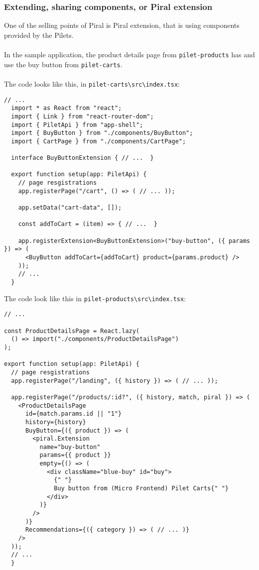 \documentclass[a4paper]{book}
\begin{document}
\subsubsection{Extending, sharing components, or Piral extension}
One of the selling points of Piral is Piral extension, that is using components provided by the Pilets. 
\\ \\
In the sample application, the product details page from \verb|pilet-products| has and use the buy button from \verb|pilet-carts|. 
\\ \\The code looks like this, in \verb|pilet-carts\src\index.tsx|:

\begin{lstlisting}[caption={pilet-carts extension}]
  // ...
  import * as React from "react";
  import { Link } from "react-router-dom";
  import { PiletApi } from "app-shell";
  import { BuyButton } from "./components/BuyButton";
  import { CartPage } from "./components/CartPage";
  
  interface BuyButtonExtension { // ...  }
  
  export function setup(app: PiletApi) {
    // page resgistrations
    app.registerPage("/cart", () => ( // ... ));
    
    app.setData("cart-data", []);
  
    const addToCart = (item) => { // ...  }
  
    app.registerExtension<BuyButtonExtension>("buy-button", ({ params }) => (
      <BuyButton addToCart={addToCart} product={params.product} />
    ));
    // ...
  }
\end{lstlisting}

The code look like this in \verb|pilet-products\src\index.tsx|:

\begin{lstlisting}[caption={pilet-products uses pilet-carts extension}]
  // ...

const ProductDetailsPage = React.lazy(
  () => import("./components/ProductDetailsPage")
);

export function setup(app: PiletApi) {
  // page resgistrations
  app.registerPage("/landing", ({ history }) => ( // ... ));

  app.registerPage("/products/:id?", ({ history, match, piral }) => (
    <ProductDetailsPage
      id={match.params.id || "1"}
      history={history}
      BuyButton={({ product }) => (
        <piral.Extension
          name="buy-button"
          params={{ product }}
          empty={() => (
            <div className="blue-buy" id="buy">
              {" "}
              Buy button from (Micro Frontend) Pilet Carts{" "}
            </div>
          )}
        />
      )}
      Recommendations={({ category }) => ( // ... )}
    />
  ));
  // ...
  }
\end{lstlisting}
\end{document}
